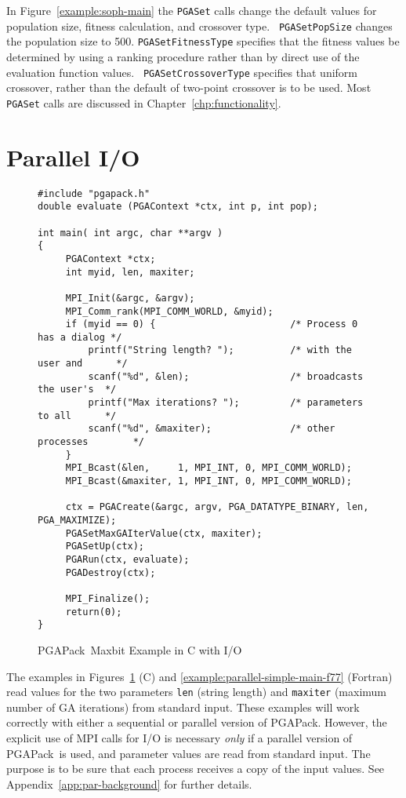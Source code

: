 \documentclass{report}
\newcommand{\pga}{PGAPack}
\begin{document}
In Figure~\ref{example:soph-main} the {\tt PGASet} calls change the default
values for population size, fitness calculation, and crossover type.  {\tt
PGASetPopSize} changes the population size to 500.  {\tt PGASetFitnessType}
specifies that the fitness values be determined by using a ranking procedure
rather than by direct use of the evaluation function values.  {\tt
PGASetCrossoverType} specifies that uniform crossover, rather than the default
of two-point crossover is to be used.  Most {\tt PGASet} calls are discussed
in Chapter~\ref{chp:functionality}.

\section{Parallel I/O}\label{sec:parallel-simple-example}

\begin{figure}
\begin{verbatim}
#include "pgapack.h"
double evaluate (PGAContext *ctx, int p, int pop);

int main( int argc, char **argv )
{
     PGAContext *ctx;
     int myid, len, maxiter;

     MPI_Init(&argc, &argv);
     MPI_Comm_rank(MPI_COMM_WORLD, &myid);
     if (myid == 0) {                        /* Process 0 has a dialog */
         printf("String length? ");          /* with the user and      */
         scanf("%d", &len);                  /* broadcasts the user's  */
         printf("Max iterations? ");         /* parameters to all      */
         scanf("%d", &maxiter);              /* other processes        */
     }
     MPI_Bcast(&len,     1, MPI_INT, 0, MPI_COMM_WORLD);
     MPI_Bcast(&maxiter, 1, MPI_INT, 0, MPI_COMM_WORLD);

     ctx = PGACreate(&argc, argv, PGA_DATATYPE_BINARY, len, PGA_MAXIMIZE);
     PGASetMaxGAIterValue(ctx, maxiter);
     PGASetUp(ctx);
     PGARun(ctx, evaluate);
     PGADestroy(ctx);

     MPI_Finalize();
     return(0);
}
\end{verbatim}
\caption{\pga\ Maxbit Example in C with I/O}
\label{example:parallel-simple-main}
\end{figure}


The examples in Figures~\ref{example:parallel-simple-main} (C) and
\ref{example:parallel-simple-main-f77} (Fortran)
read values for the two parameters {\tt len} (string length) and {\tt maxiter}
(maximum number of GA iterations) from standard input.  These examples will
work correctly with either a sequential or parallel version of \pga.  However,
the explicit use of MPI calls for I/O is necessary {\em only} if a parallel
version of \pga\ is used, and parameter values are read from standard input.
The purpose is to be sure that each process receives a copy of the input
values.  See Appendix~\ref{app:par-background} for further details.
\end{document}
